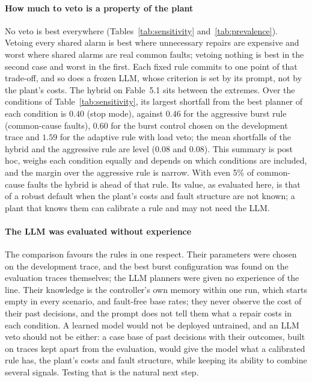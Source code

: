 \documentclass[preprint,11pt]{elsarticle}
\begin{document}
\paragraph{How much to veto is a property of the plant}
No veto is best everywhere (Tables~\ref{tab:sensitivity} and~\ref{tab:prevalence}). Vetoing every shared alarm is best where unnecessary repairs are expensive and worst where shared alarms are real common faults; vetoing nothing is best in the second case and worst in the first. Each fixed rule commits to one point of that trade-off, and so does a frozen LLM, whose criterion is set by its prompt, not by the plant's costs. The hybrid on Fable~5.1 sits between the extremes. Over the conditions of Table~\ref{tab:sensitivity}, its largest shortfall from the best planner of each condition is $0.40$ (stop mode), against $0.46$ for the aggressive burst rule (common-cause faults), $0.60$ for the burst control chosen on the development trace and $1.59$ for the adaptive rule with load veto; the mean shortfalls of the hybrid and the aggressive rule are level ($0.08$ and $0.08$). This summary is post hoc, weighs each condition equally and depends on which conditions are included, and the margin over the aggressive rule is narrow. With even 5\% of common-cause faults the hybrid is ahead of that rule. Its value, as evaluated here, is that of a robust default when the plant's costs and fault structure are not known; a plant that knows them can calibrate a rule and may not need the LLM.

\paragraph{The LLM was evaluated without experience}
The comparison favours the rules in one respect. Their parameters were chosen on the development trace, and the best burst configuration was found on the evaluation traces themselves; the LLM planners were given no experience of the line. Their knowledge is the controller's own memory within one run, which starts empty in every scenario, and fault-free base rates; they never observe the cost of their past decisions, and the prompt does not tell them what a repair costs in each condition. A learned model would not be deployed untrained, and an LLM veto should not be either: a case base of past decisions with their outcomes, built on traces kept apart from the evaluation, would give the model what a calibrated rule has, the plant's costs and fault structure, while keeping its ability to combine several signals. Testing that is the natural next step.
\end{document}
